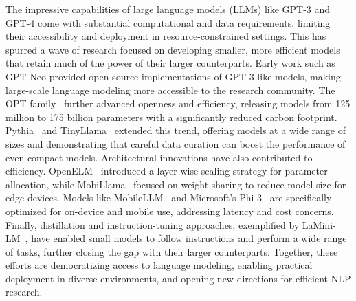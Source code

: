 The impressive capabilities of large language models (LLMs) like GPT-3 and GPT-4 come with substantial computational and data requirements, limiting their accessibility and deployment in resource-constrained settings. This has spurred a wave of research focused on developing smaller, more efficient models that retain much of the power of their larger counterparts.
Early work such as GPT-Neo provided open-source implementations of GPT-3-like models, making large-scale language modeling more accessible to the research community. The OPT family~\citep{zhang2022opt} further advanced openness and efficiency, releasing models from 125 million to 175 billion parameters with a significantly reduced carbon footprint. Pythia~\citep{biderman2023pythia} and TinyLlama~\citep{zhang2024tinyllama} extended this trend, offering models at a wide range of sizes and demonstrating that careful data curation can boost the performance of even compact models.
Architectural innovations have also contributed to efficiency. OpenELM~\citep{mehta2024openelm} introduced a layer-wise scaling strategy for parameter allocation, while MobiLlama~\citep{thawakar2024mobillama} focused on weight sharing to reduce model size for edge devices. Models like MobileLLM~\citep{liu2024mobilellm} and Microsoft's Phi-3~\citep{abdin2024phi} are specifically optimized for on-device and mobile use, addressing latency and cost concerns.
Finally, distillation and instruction-tuning approaches, exemplified by LaMini-LM~\citep{wu2024lamini}, have enabled small models to follow instructions and perform a wide range of tasks, further closing the gap with their larger counterparts.
Together, these efforts are democratizing access to language modeling, enabling practical deployment in diverse environments, and opening new directions for efficient NLP research.



